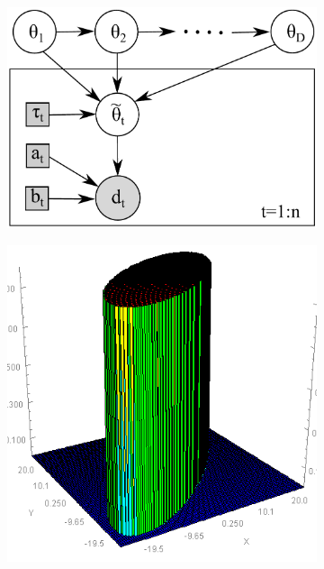 \begin{figure}
\centering
\begin{subfigure}{.35\textwidth}
\centering
\includegraphics[width=.90\textwidth]{pic/market4w.pdf}
\caption{}%
\label{fig:market}
\end{subfigure}
\begin{subfigure}{.24\textwidth}%
  \centering
  \includegraphics[width=.95\textwidth]{pic/elipsePrior.png}
  \caption{}

\end{subfigure}
\end{figure}
